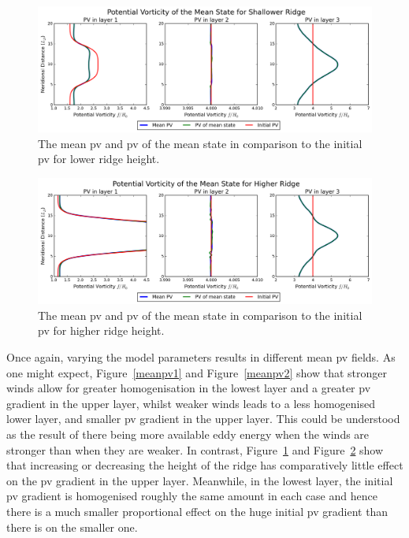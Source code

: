 \documentclass[12pt,a4paper]{report}
\newcommand*\figref[1]{Figure~\ref{#1}}
\begin{document}
 \begin{figure}
 	\centering
 	\includegraphics[width=\linewidth]{meanpv_3}
 	\caption{The mean \gls{pv} and \gls{pv} of the mean state in
 		comparison to the initial \gls{pv} for lower ridge height. }
 	\label{meanpv3}
 \end{figure}
 
 \begin{figure}
 	\centering
 	\includegraphics[width=\linewidth]{meanpv_4}
 	\caption{The mean \gls{pv} and \gls{pv} of the mean state in
 		comparison to the initial \gls{pv} for higher ridge height. }
 	\label{meanpv4}
 \end{figure}
 
 Once again, varying the model parameters results in different mean \gls{pv} fields.
 As one might expect, \figref{meanpv1} and \figref{meanpv2} show that stronger winds allow for greater homogenisation in the lowest layer and a 
 greater \gls{pv} gradient in the upper layer, whilst weaker winds
 leads to a less homogenised lower layer, and smaller \gls{pv} gradient in the upper layer.
  This could be understood as the result of there being more available eddy energy
  when the winds are stronger than when they are weaker. In contrast, 
  \figref{meanpv3} and \figref{meanpv4} show that increasing or decreasing the 
  height of the ridge has comparatively little effect on the \gls{pv} gradient in
  the upper layer. Meanwhile, in the lowest layer, the initial \gls{pv} gradient is
  homogenised roughly the same amount in each case and hence there is a much smaller 
  proportional effect  on the huge initial \gls{pv} gradient than there is on the 
  smaller one.
  
\end{document}
